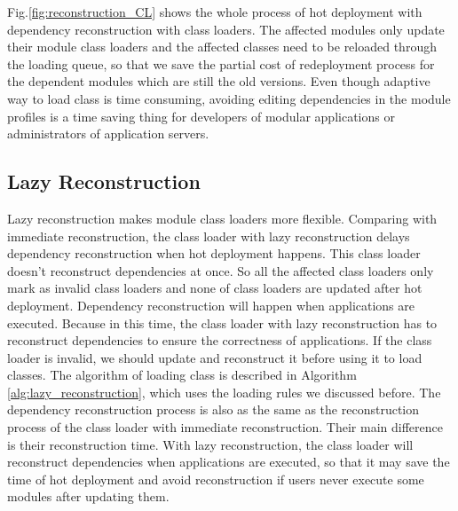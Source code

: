 \documentclass[conference]{IEEEtran}
\begin{document}
Fig.\ref{fig:reconstruction_CL} shows the whole process of hot deployment with dependency reconstruction with class loaders. 
The affected modules only update their module class loaders and the affected classes need to be reloaded through the loading queue, so that we save the partial cost of redeployment process for the dependent modules which are still the old versions. 
Even though adaptive way to load class is time consuming, avoiding editing dependencies in the module profiles is a time saving thing for developers of modular applications or administrators of application servers.


\subsection{Lazy Reconstruction}

Lazy reconstruction makes module class loaders more flexible.
Comparing with immediate reconstruction, the class loader with lazy reconstruction delays dependency reconstruction when hot deployment happens.
This class loader doesn't reconstruct dependencies at once. 
So all the affected class loaders only mark as invalid class loaders and none of class loaders are updated after hot deployment.
Dependency reconstruction will happen when applications are executed.
Because in this time, the class loader with lazy reconstruction has to reconstruct dependencies to ensure the correctness of applications.
If the class loader is invalid, we should update and reconstruct it before using it to load classes. 
The algorithm of loading class is described in Algorithm \ref{alg:lazy_reconstruction}, which uses the loading rules we discussed before.
The dependency reconstruction process is also as the same as the reconstruction process of the class loader with immediate reconstruction.
Their main difference is their reconstruction time.
With lazy reconstruction, the class loader will reconstruct dependencies when applications are executed, so that it may save the time of hot deployment and avoid reconstruction if users never execute some modules after updating them.
\end{document}
